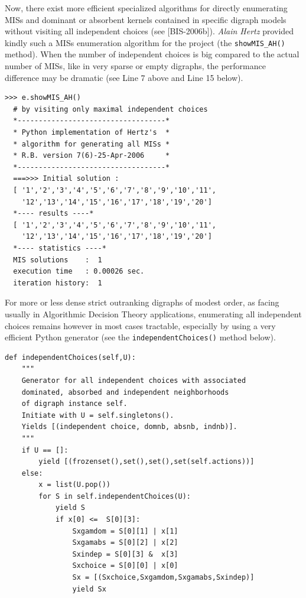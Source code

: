 Now, there exist more efficient specialized algorithms for directly enumerating MISs and dominant or absorbent kernels contained in specific digraph models without visiting all independent choices (see [BIS-2006b]). \emph{Alain Hertz} provided kindly such a MISs enumeration algorithm for the \Digraph project (the \texttt{showMIS\_AH()} method). When the number of independent choices is big compared to the actual number of MISs, like in very sparse or empty digraphs, the performance difference may be dramatic (see Line 7 above and Line 15 below).
\begin{lstlisting}
>>> e.showMIS_AH()
  # by visiting only maximal independent choices
  *-----------------------------------*
  * Python implementation of Hertz's  *
  * algorithm for generating all MISs *
  * R.B. version 7(6)-25-Apr-2006     *
  *-----------------------------------*
  ===>>> Initial solution :
  [ '1','2','3','4','5','6','7','8','9','10','11',
    '12','13','14','15','16','17','18','19','20']
  *---- results ----*
  [ '1','2','3','4','5','6','7','8','9','10','11',
    '12','13','14','15','16','17','18','19','20']
  *---- statistics ----*
  MIS solutions    :  1
  execution time   : 0.00026 sec.
  iteration history:  1
\end{lstlisting}

For more or less dense strict outranking digraphs of modest order, as facing usually in Algorithmic Decision Theory applications, enumerating all independent choices remains however in most cases tractable, especially by using a very efficient Python generator (see the \texttt{independentChoices()} method below).
\begin{lstlisting}
def independentChoices(self,U):
    """
    Generator for all independent choices with associated
    dominated, absorbed and independent neighborhoods
    of digraph instance self.
    Initiate with U = self.singletons().
    Yields [(independent choice, domnb, absnb, indnb)].
    """
    if U == []:
        yield [(frozenset(),set(),set(),set(self.actions))]
    else:
        x = list(U.pop())
        for S in self.independentChoices(U):
            yield S
            if x[0] <=  S[0][3]:
                Sxgamdom = S[0][1] | x[1]
                Sxgamabs = S[0][2] | x[2]
                Sxindep = S[0][3] &  x[3]
                Sxchoice = S[0][0] | x[0]
                Sx = [(Sxchoice,Sxgamdom,Sxgamabs,Sxindep)]
                yield Sx
\end{lstlisting}

